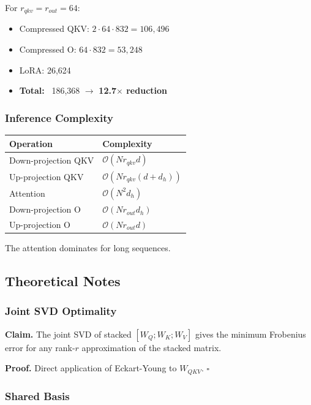For $r_{qkv} = r_{out} = 64$:
\begin{itemize}
\item Compressed QKV: $2 \cdot 64 \cdot 832 = 106,496$
\item Compressed O: $64 \cdot 832 = 53,248$
\item LoRA: 26,624
\item \textbf{Total:} ~186,368 $\to$ \textbf{12.7$\times$ reduction}

\end{itemize}
\subsubsection{Inference Complexity}

\begin{table}[H]
\centering
\small
\begin{tabular}{ll}
\toprule
\textbf{Operation} & \textbf{Complexity} \\
\midrule
Down-projection QKV & $\mathcal{O}(N r_{qkv} d)$ \\
Up-projection QKV & $\mathcal{O}(N r_{qkv} (d + d_h))$ \\
Attention & $\mathcal{O}(N^2 d_h)$ \\
Down-projection O & $\mathcal{O}(N r_{out} d_h)$ \\
Up-projection O & $\mathcal{O}(N r_{out} d)$ \\
\bottomrule
\end{tabular}
\end{table}

The attention dominates for long sequences.

\subsection{Theoretical Notes}

\subsubsection{Joint SVD Optimality}

\textbf{Claim.} The joint SVD of stacked $[W_Q; W_K; W_V]$ gives the minimum 
Frobenius error for any rank-$r$ approximation of the stacked matrix.

\textbf{Proof.} Direct application of Eckart-Young to $W_{QKV}$. $\square$

\subsubsection{Shared Basis}

